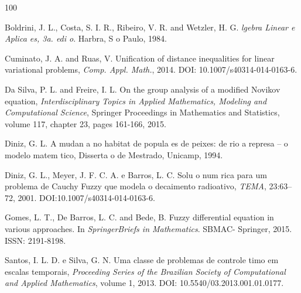 \documentclass{article}
\begin{document}
\begin{thebibliography}{100}

Boldrini, J. L., Costa, S. I. R., Ribeiro, V. R. and Wetzler, H. G. {\it  lgebra Linear e Aplica es, 3a. edi o}. Harbra, S o Paulo, 1984.

Cuminato, J. A. and Ruas, V. Unification of distance inequalities for linear variational problems, 
{\it Comp. Appl. Math.}, 2014. DOI: 10.1007/s40314-014-0163-6.
 
Da Silva, P. L. and Freire, I. L. On the group analysis of a modified Novikov equation, 
{\it Interdisciplinary Topics in Applied Mathematics, Modeling and Computational Science}, 
Springer Proceedings in Mathematics and Statistics,  volume 117, chapter 23, pages 161-166, 2015.

Diniz, G. L. A mudan a no habitat de popula es de peixes: de rio a represa -- o modelo 
matem tico, Disserta o de Mestrado, Unicamp, 1994.

Diniz, G. L., Meyer, J. F. C. A. e Barros, L. C. Solu o num rica para um problema de 
Cauchy Fuzzy que modela o decaimento radioativo, {\it TEMA},  23:63--72, 2001. DOI:10.1007/s40314-014-0163-6.

Gomes, L. T., De Barros, L. C. and Bede, B. Fuzzy differential equation in various approaches. 
In {\it SpringerBriefs in Mathematics}. SBMAC- Springer, 2015. ISSN: 2191-8198.



 Santos, I. L. D. e Silva, G. N. Uma classe de problemas de controle  timo 
em escalas temporais, {\it Proceeding Series of the Brazilian Society of Computational and 
Applied Mathematics}, volume 1, 2013. DOI: 10.5540/03.2013.001.01.0177.

\end{thebibliography}


\end{document}
